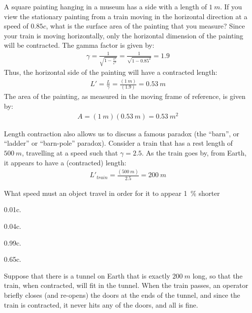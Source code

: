 \begin{example}{A square painting hanging in a museum has a side with a length of $\SI{1}{m}$. If you view the stationary painting from a train moving in the horizontal direction at a speed of $0.85c$, what is the surface area of the painting that you measure?}
Since your train is moving horizontally, only the horizontal dimension of the painting will be contracted. The gamma factor is given by:
\begin{align*}
\gamma = \frac{1}{\sqrt{1-\frac{v^2}{c^2}}} =\frac{1}{\sqrt{1-0.85^2}}=1.9
\end{align*}
Thus, the horizontal side of the painting will have a contracted length:
\begin{align*}
L'=\frac{L}{\gamma}=\frac{(\SI{1}{m})}{(1.9)}=\SI{0.53}{m}
\end{align*}
The area of the painting, as measured in the moving frame of reference, is given by:
\begin{align*}
A= (\SI{1}{m})(\SI{0.53}{m})=\SI{0.53}{m^2}
\end{align*}
\end{example}
Length contraction also allows us to discuss a famous paradox (the ``barn'', or ``ladder'' or ``barn-pole'' paradox). Consider a train that has a rest length of $\SI{500}{m}$, travelling at a speed such that $\gamma = 2.5$. As the train goes by, from Earth, it appears to have a (contracted) length:
\begin{align*}
L'_{train}=\frac{(\SI{500}{m})}{2.5}=\SI{200}{m}
\end{align*}

\begin{checkpoint}{}
	\begin{MCquestion}{What speed must an object travel in order for it to appear \SI{1}{\percent} shorter}
		\item \SI{0.01c}{}. 
		\item \SI{0.04c}{}. \correct
		\item \SI{0.99c}{}.
		\item \SI{0.65c}{}.
	\end{MCquestion}
\end{checkpoint}

Suppose that there is a tunnel on Earth that is exactly $\SI{200}{m}$ long, so that the train, when contracted, will fit in the tunnel. When the train passes, an operator briefly closes (and re-opens) the doors at the ends of the tunnel, and since the train is contracted, it never hits any of the doors, and all is fine.

